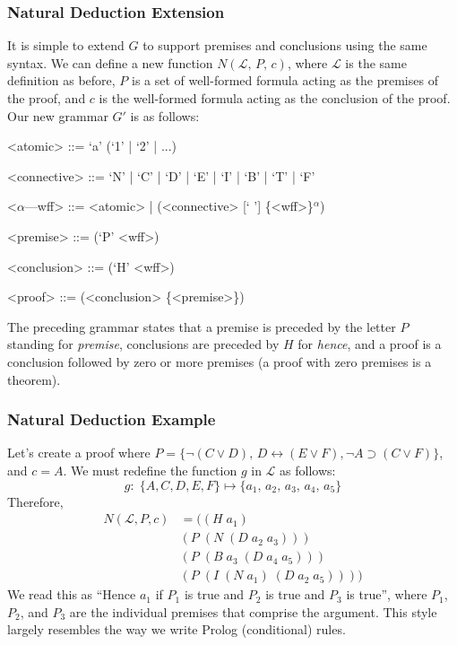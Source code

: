 \documentclass[ms]{uncgdissertationexp2}
\theoremstyle{plain}
\theoremstyle{definition}
\theoremstyle{remark}
\begin{document}
\subsubsection{Natural Deduction Extension} It is simple to extend $G$ to support premises and conclusions using the same syntax. We can define a new function $N(\mathcal{L},\,P,\,c)$, where $\mathcal{L}$ is the same definition as before, $P$ is a set of well-formed formula acting as the premises of the proof, and $c$ is the well-formed formula acting as the conclusion of the proof. Our new grammar $G'$ is as follows:

\begin{grammar}
	<atomic> ::= `a' (`1' | `2' | ...)
	
	<connective> ::= `N' | `C' | `D' | `E' | `I' | `B' | `T' | `F' 
	
	<$\alpha$---wff> ::= <atomic> | (<connective> [` '] \{<wff>\}$^{\alpha}$)
	
	<premise> ::= (`P' <wff>)
	
	<conclusion> ::= (`H' <wff>)
	
	<proof> ::= (<conclusion> \{<premise>\})
\end{grammar}

The preceding grammar states that a premise is preceded by the letter $P$ standing for \textit{premise}, conclusions are preceded by $H$ for \textit{hence}, and a proof is a conclusion followed by zero or more premises (a proof with zero premises is a theorem).\\

\subsubsection{Natural Deduction Example}
Let's create a proof where $P = \{\lnot(C \lor D),\,D \leftrightarrow (E \lor F), \lnot A \supset (C \lor F)\}$, and $c = A$. We must redefine the function $g$ in $\mathcal{L}$ as follows:
\[
	g:\;\{A, C, D, E, F\} \mapsto \{a_1,\,a_2,\,a_3,\,a_4,\,a_5\}
\]
\noindent Therefore, 
\begin{align*}
	N(\mathcal{L}, P, c) & = ((H\;a_1)\;                      \\
	                     & (P\;(N\;(D\;a_2\;a_3)))            \\
	                     & (P\;(B\;a_3\;(D\;a_4\;a_5)))       \\
	                     & (P\;(I\;(N\;a_1)\;(D\;a_2\;a_5))))
\end{align*}
We read this as ``Hence $a_1$ if $P_1$ is true and $P_2$ is true and $P_3$ is true'', where $P_1$, $P_2$, and $P_3$ are the individual premises that comprise the argument. This style largely resembles the way we write Prolog (conditional) rules. 
\end{document}

